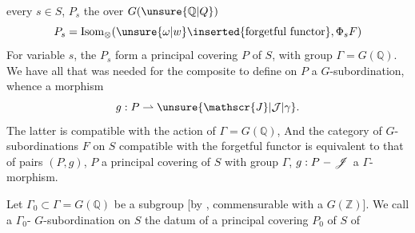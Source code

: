 every $s\in S$, $P_s$ the  over $G(\unsure{\mathbb{Q}|Q})$
\[
 P_s=\operatorname{Isom}_{\otimes}(\unsure{\omega|w}\inserted{\text{forgetful functor}},\Phi_sF)
\]
For variable $s$, the $P_s$ form a principal  covering $P$ of $S$, with group $\Gamma=G(\mathbb{Q})$. We have all that was needed for the \unsure{$\otimes$} composite
 to define on $P$ a $G$-subordination, whence a morphism
\[
 g:P\rightharpoonup\unsure{\mathscr{J}|\mathcal{J}|\gamma}.
\]
 The latter is compatible with the action of $\Gamma=G(\mathbb{Q})$,  And the category of  $G$-subordinations $F$ on $S$ compatible with the forgetful functor is equivalent to that of pairs $(P,g)$, $P$ a principal covering of $S$ with group $\Gamma$, $g:P\relbar\mathscr{J}$ a $\Gamma$-morphism.

Let $\Gamma_0\subset\Gamma=G(\mathbb{Q})$ be a subgroup [by , commensurable with a $G(\mathbb{Z})$]. We call a $\Gamma_0$- $G$-subordination on $S$ the datum of a principal covering $P_0$ of $S$ of

